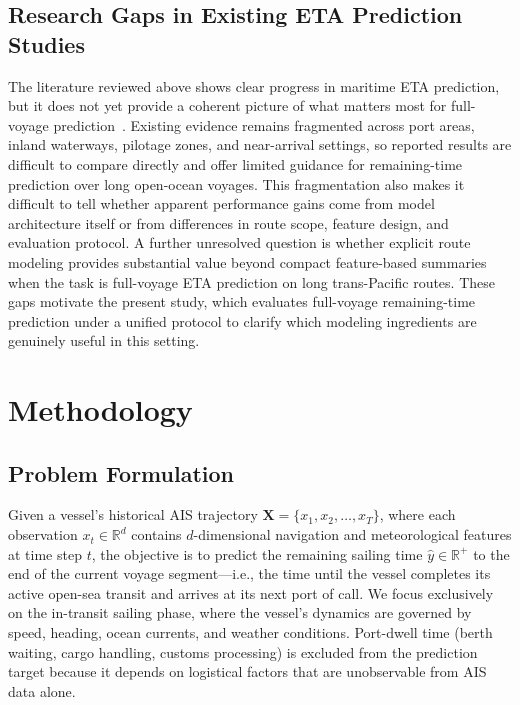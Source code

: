 \documentclass[conference]{IEEEtran}
\begin{document}
\subsection{Research Gaps in Existing ETA Prediction Studies}
The literature reviewed above shows clear progress in maritime ETA prediction, but it does not yet provide a coherent picture of what matters most for full-voyage prediction~\cite{jiangPredictionVesselArrival2025,nomanReviewVesselTime2025}. Existing evidence remains fragmented across port areas, inland waterways, pilotage zones, and near-arrival settings, so reported results are difficult to compare directly and offer limited guidance for remaining-time prediction over long open-ocean voyages. This fragmentation also makes it difficult to tell whether apparent performance gains come from model architecture itself or from differences in route scope, feature design, and evaluation protocol. A further unresolved question is whether explicit route modeling provides substantial value beyond compact feature-based summaries when the task is full-voyage ETA prediction on long trans-Pacific routes. These gaps motivate the present study, which evaluates full-voyage remaining-time prediction under a unified protocol to clarify which modeling ingredients are genuinely useful in this setting.

\section{Methodology}

\subsection{Problem Formulation}

Given a vessel's historical AIS trajectory $\mathbf{X} = \{x_1, x_2, \ldots, x_T\}$, where each observation $x_t \in \mathbb{R}^{d}$ contains $d$-dimensional navigation and meteorological features at time step $t$, the objective is to predict the remaining sailing time $\hat{y} \in \mathbb{R}^{+}$ to the end of the current voyage segment---i.e., the time until the vessel completes its active open-sea transit and arrives at its next port of call.
We focus exclusively on the in-transit sailing phase, where the vessel's dynamics are governed by speed, heading, ocean currents, and weather conditions. Port-dwell time (berth waiting, cargo handling, customs processing) is excluded from the prediction target because it depends on logistical factors that are unobservable from AIS data alone.
\end{document}
